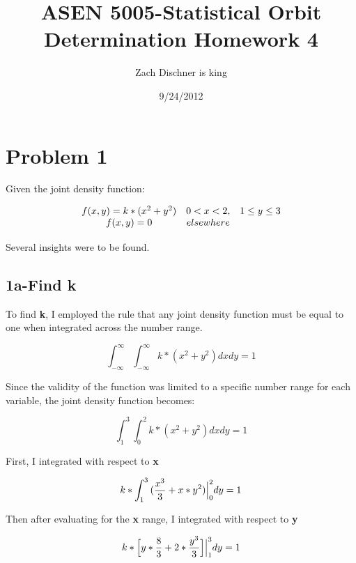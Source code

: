 \documentclass[]{article}
\begin{document}
\title{ASEN 5005-Statistical Orbit Determination
Homework 4}
\author{Zach Dischner is king}
\date{9/24/2012}
\maketitle

\section{Problem 1}
Given the joint density function:

\[\begin{array}[b]{ccc}
f(x,y)=k*(x^2+y^2)   &  0<x<2,&1\le y\le 3 \cr 
 f(x,y) = 0 & elsewhere & 
\end{array}\]

Several insights were to be found.



\subsection*{1a-Find k} 
To find {\bf k}, I employed the rule that any joint density function must be equal to one when integrated across the number range. 


\begin{equation} 
	 \int_{-\infty}^\infty{\int_{-\infty}^\infty{ k*(x^2 + y^2) } dx dy} = 1 
\end{equation}

\noindent Since the validity of the function was limited to a specific number range for each variable, the joint density function  becomes:

\begin{displaymath}
	\int_1^3{\int_0^2{ k*(x^2 + y^2) } dx dy} = 1 
\end{displaymath}

\noindent First, I integrated with respect to {\bf x}

\begin{displaymath}
	{k*\int_1^3{(\frac{x^3 }{ 3} + x*y^2) } \Big{|}_0^2 dy} = 1 
\end{displaymath}

\noindent Then after evaluating for the {\bf x} range, I integrated with respect to  {\bf y}

\begin{displaymath}
	{k*\Big{ [ } y*\frac{8}{3} + 2*\frac{y^3}{3} \Big{ ] }  \Big{|}_1^3 dy} = 1 
\end{displaymath}
\end{document}
